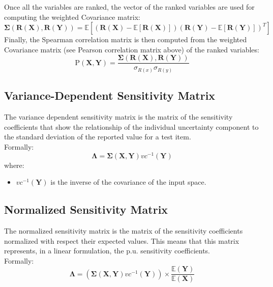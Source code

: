 Once all the variables are ranked, the vector of the ranked variables are used for computing the weighted Covariance matrix:
\begin{equation}
 \boldsymbol{\Sigma}(\boldsymbol{R(X)},\boldsymbol{R(Y)})  = \mathbb{E} \left [ \left ( \boldsymbol{R(X)}- \mathbb{E}\left [ \boldsymbol{R(X)} \right ] \right ) \left ( \boldsymbol{R(Y)}- \mathbb{E}\left [ \boldsymbol{R(Y)} \right ] \right )^{T}\right ]
\end{equation}
Finally, the Spearman correlation  matrix  is then computed from the weighted Covariance matrix (see Pearson correlation matrix above) of the ranked variables:
 \begin{equation}
\boldsymbol{\mathrm{P}}(\boldsymbol{X},\boldsymbol{Y}) = \frac{\boldsymbol{\Sigma}(\boldsymbol{R(X)},\boldsymbol{R(Y)})}{\sigma_{R(x)} \sigma_{R(y)}}
\end{equation}

\subsection{Variance-Dependent Sensitivity Matrix}
The variance dependent sensitivity matrix is the matrix of the sensitivity
coefficients that show the relationship of the individual uncertainty
component to the standard deviation of the reported value for a test
item.
\\ Formally:
\begin{equation}
\boldsymbol{\Lambda}= \boldsymbol{\Sigma}(\boldsymbol{X},\boldsymbol{Y})  vc^{-1}(\boldsymbol{Y})
\end{equation}
where:
\begin{itemize}
  \item $vc^{-1}(\boldsymbol{Y})$ is the inverse of the covariance of the
  input space.
\end{itemize}

\subsection{Normalized Sensitivity Matrix}
The normalized sensitivity matrix is the matrix of the sensitivity
coefficients normalized with respect their expected values. This means that this matrix
represents, in a linear formulation, the p.u. sensitivity coefficients.
\\ Formally:
\begin{equation}
\boldsymbol{\Lambda}= \left ( \boldsymbol{\Sigma}(\boldsymbol{X},\boldsymbol{Y})  vc^{-1}(\boldsymbol{Y}) \right ) \times \frac{\mathbb{E}(\boldsymbol{Y}) }{\mathbb{E}(\boldsymbol{X}) } 
\end{equation}

